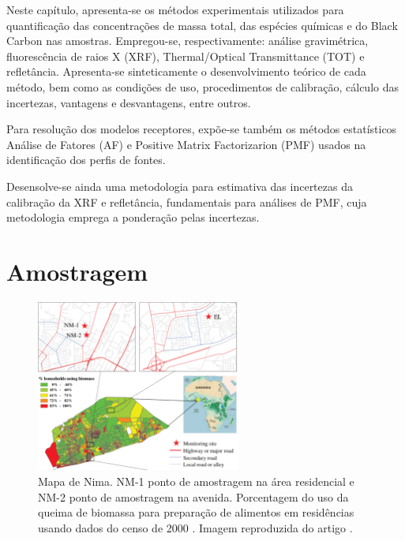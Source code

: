 Neste capítulo, apresenta-se os métodos experimentais utilizados para 
quantificação das concentrações de massa total, das espécies químicas e 
do Black Carbon nas amostras. Empregou-se, respectivamente:
análise gravimétrica, fluorescência de raios X (XRF),
Thermal/Optical Transmittance (TOT) e refletância.
Apresenta-se sinteticamente o desenvolvimento teórico de cada método, bem como 
as condições de uso, procedimentos de calibração, cálculo das incertezas, 
vantagens e desvantagens, entre outros.

Para resolução dos modelos receptores, expõe-se também os métodos 
estatísticos Análise de Fatores (AF) e Positive Matrix Factorizarion (PMF) 
usados na identificação dos perfis de fontes. 

Desensolve-se ainda uma metodologia para estimativa das incertezas
da calibração da XRF e refletância, fundamentais para análises de PMF,
cuja metodologia emprega a ponderação pelas incertezas.

\newpage
\section{Amostragem}

\begin{figure}[H]
\begin{center}
  \includegraphics[width=0.6\textwidth]{../inputs/images/zheng/nima_mapa.pdf}
  \caption{Mapa de Nima. NM-1 ponto de amostragem na área residencial e 
           NM-2 ponto de amostragem na avenida. Porcentagem do uso da queima
           de biomassa para preparação de alimentos em residências usando dados
           do censo de 2000 \citep{ghanacensus2003}. Imagem reproduzida do 
           artigo \citet{zhou2013}. \label{fig:nima_mapa}}
\end{center}
\end{figure}

